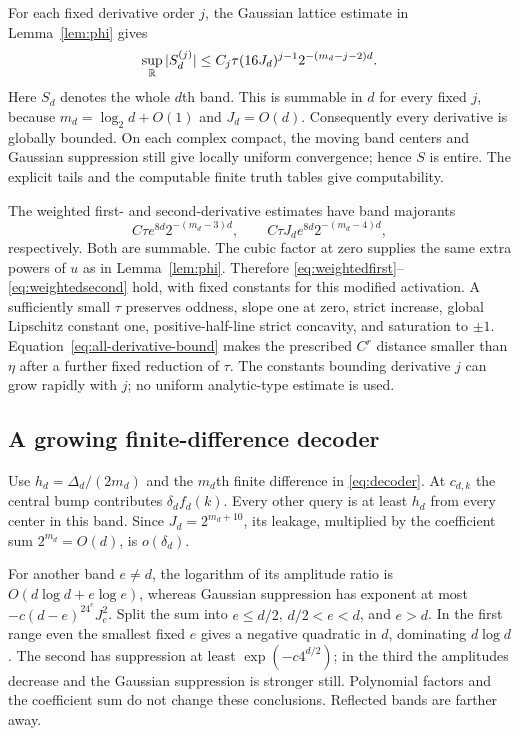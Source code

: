 For each fixed derivative order $j$, the Gaussian lattice estimate
in Lemma~\ref{lem:phi} gives
\begin{equation}\label{eq:all-derivative-bound}
 \sup_{\mathbb R}|S_d^{(j)}|
 \le C_j\tau(16J_d)^{j-1}2^{-(m_d-j-2)d}.
\end{equation}
Here $S_d$ denotes the whole $d$th band. This is summable in $d$
for every fixed $j$, because $m_d=\log_2d+O(1)$ and $J_d=O(d)$.
Consequently every derivative is globally bounded. On each complex
compact, the moving band centers and Gaussian suppression still
give locally uniform convergence; hence $S$ is entire. The explicit
tails and the computable finite truth tables give computability.

The weighted first- and second-derivative estimates have band
majorants
\[
 C\tau e^{8d}2^{-(m_d-3)d},\qquad
 C\tau J_de^{8d}2^{-(m_d-4)d},
\]
respectively. Both are summable. The cubic factor at zero supplies
the same extra powers of $u$ as in Lemma~\ref{lem:phi}. Therefore
\eqref{eq:weightedfirst}--\eqref{eq:weightedsecond} hold, with fixed
constants for this modified activation. A sufficiently small $\tau$
preserves oddness, slope one at zero, strict increase, global
Lipschitz constant one, positive-half-line strict concavity, and
saturation to $\pm1$. Equation~\eqref{eq:all-derivative-bound} makes
the prescribed $C^r$ distance smaller than $\eta$ after a further
fixed reduction of $\tau$. The constants bounding derivative $j$
can grow rapidly with $j$; no uniform analytic-type estimate is used.

\subsection{A growing finite-difference decoder}

Use $h_d=\Delta_d/(2m_d)$ and the $m_d$th finite difference in
\eqref{eq:decoder}. At $c_{d,k}$ the central bump contributes
$\delta_df_d(k)$. Every other query is at least $h_d$ from every
center in this band. Since $J_d=2^{m_d+10}$, its leakage, multiplied
by the coefficient sum $2^{m_d}=O(d)$, is $o(\delta_d)$.

For another band $e\ne d$, the logarithm of its amplitude ratio
is $O(d\log d+e\log e)$, whereas Gaussian suppression has exponent
at most $-c(d-e)^24^eJ_e^2$. Split the sum into $e\le d/2$,
$d/2<e<d$, and $e>d$. In the first range even the smallest fixed
$e$ gives a negative quadratic in $d$, dominating $d\log d$.
The second has suppression at least $\exp(-c4^{d/2})$; in the
third the amplitudes decrease and the Gaussian suppression is
stronger still. Polynomial factors and the coefficient sum do not
change these conclusions. Reflected bands are farther away.


